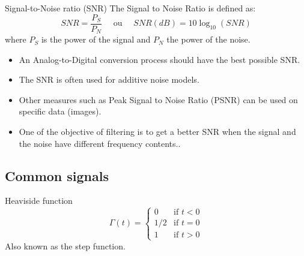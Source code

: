     \begin{block}{Signal-to-Noise ratio (SNR)} 
      The Signal to Noise Ratio is defined as:
  \begin{equation}
    \label{eq:rsb}
    SNR=\frac{P_S}{P_N} \quad \text{ ou } \quad SNR(dB)=10\log_{10}(SNR)
  \end{equation}
  where $P_S$ is the power of the signal and $P_N$ the power of the noise.
  \begin{itemize}
  \item An Analog-to-Digital conversion process should have the best possible SNR.
  \item The SNR is often used for additive noise models.
  \item Other measures such as Peak Signal to Noise Ratio (PSNR) can be used on specific data (images).
  \item One of the objective of filtering is to get a better SNR when the signal and the noise have different frequency contents..
  \end{itemize}
    \end{block}





\subsection{Common signals}
\label{sec:common_sig}


\begin{block}{Heaviside function}
  \begin{equation}
\label{eq:heaviside}
\Gamma(t)=
\begin{cases}
  0& \text{if } t<0\\
  1/2& \text{if } t=0\\
  1 & \text{if } t>0
\end{cases}
\end{equation}
Also known as the step function.
\end{block}

